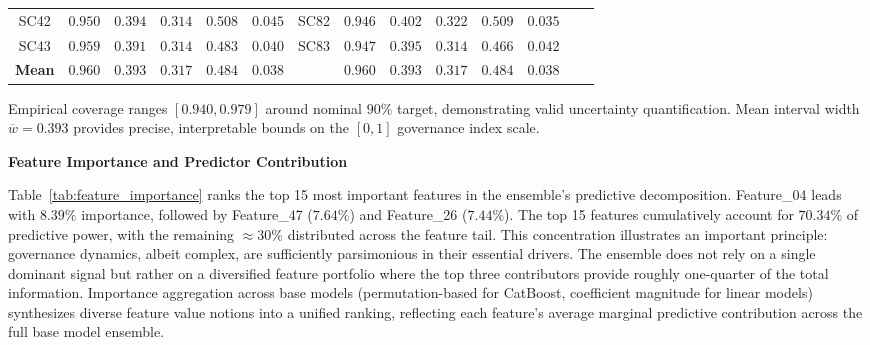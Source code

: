\documentclass[12pt,a4paper]{article}
\begin{document}
\begin{table}[H]
\begin{tabular}{cccccccccccccc}
SC42 & $0.950$ & $0.394$ & $0.314$ & $0.508$ & $0.045$ & SC82 & $0.946$ & $0.402$ & $0.322$ & $0.509$ & $0.035$ \\
SC43 & $0.959$ & $0.391$ & $0.314$ & $0.483$ & $0.040$ & SC83 & $0.947$ & $0.395$ & $0.314$ & $0.466$ & $0.042$ \\
\midrule
\textbf{Mean} & $0.960$ & $0.393$ & $0.317$ & $0.484$ & $0.038$ & & $0.960$ & $0.393$ & $0.317$ & $0.484$ & $0.038$ \\
\bottomrule
\end{tabular}
\begin{flushleft}
\footnotesize
Empirical coverage ranges $[0.940, 0.979]$ around nominal $90\%$ target, demonstrating valid uncertainty quantification.
Mean interval width $\overline{w} = 0.393$ provides precise, interpretable bounds on the $[0, 1]$ governance index scale.
\end{flushleft}
\end{table}

\FloatBarrier

\textbf{Feature Importance and Predictor Contribution}

Table~\ref{tab:feature_importance} ranks the top 15 most important features in the ensemble's predictive decomposition. Feature\_04 leads with $8.39\%$ importance, followed by Feature\_47 ($7.64\%$) and Feature\_26 ($7.44\%$). The top 15 features cumulatively account for $70.34\%$ of predictive power, with the remaining $\approx 30\%$ distributed across the feature tail. This concentration illustrates an important principle: governance dynamics, albeit complex, are sufficiently parsimonious in their essential drivers. The ensemble does not rely on a single dominant signal but rather on a diversified feature portfolio where the top three contributors provide roughly one-quarter of the total information. Importance aggregation across base models (permutation-based for CatBoost, coefficient magnitude for linear models) synthesizes diverse feature value notions into a unified ranking, reflecting each feature's average marginal predictive contribution across the full base model ensemble.
\end{document}
